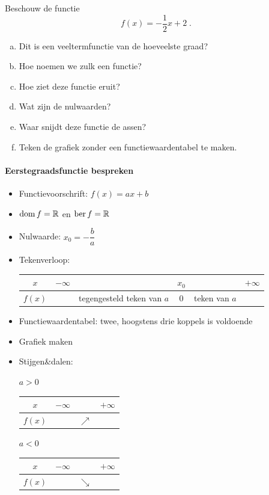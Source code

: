 \documentclass[12pt]{article}
\begin{document}
\begin{oefening}
  Beschouw de functie
  $$f(x)=-\dfrac{1}{2}x+2\;.$$
  \begin{enumerate}[(a)]
  \item Dit is een veeltermfunctie van de hoeveelste graad?
  \item Hoe noemen we zulk een functie?
  \item Hoe ziet deze functie eruit?
  \item Wat zijn de nulwaarden?
  \item Waar snijdt deze functie de assen?
  \item Teken de grafiek zonder een functiewaardentabel te maken.
  \end{enumerate}
\end{oefening}

\begin{theorie}

\paragraph*{Eerstegraadsfunctie bespreken}
\begin{mdframed}
  \begin{itemize}
  \item Functievoorschrift: $f(x)=ax + b$
  \item $\dom f = \mathbb{R}$ en $\ber f = \mathbb{R}$
  \item Nulwaarde: $x_0=-\dfrac{b}{a}$
  \item Tekenverloop:
    \begin{center}
      \begin{tabular}{c|lp{2.5cm}cp{1.5cm}r}
        $x$ & $-\infty$ & & $x_0$ & & $+\infty$\\
        \hline
        $f(x)$ & & tegengesteld teken van $a$ & 0 & teken van $a$ &
      \end{tabular}
    \end{center}
  \item Functiewaardentabel: twee, hoogstens drie koppels is voldoende
  \item Grafiek maken
  \item Stijgen\&dalen:\\
    \begin{minipage}{0.45\textwidth}
      \centering $a>0$\\
      \begin{tabular}{c|lcr}
        $x$ & $-\infty$ & & $+\infty$\\
        \hline
        $f(x)$ & & $\nearrow$ &
      \end{tabular}
    \end{minipage}
    \begin{minipage}{0.45\textwidth}
      \centering $a<0$\\
      \begin{tabular}{c|lcr}
        $x$ & $-\infty$ & & $+\infty$\\
        \hline
        $f(x)$ & & $\searrow$ &
      \end{tabular}
    \end{minipage}
  \end{itemize}
\end{mdframed}


\end{theorie}
\end{document}
